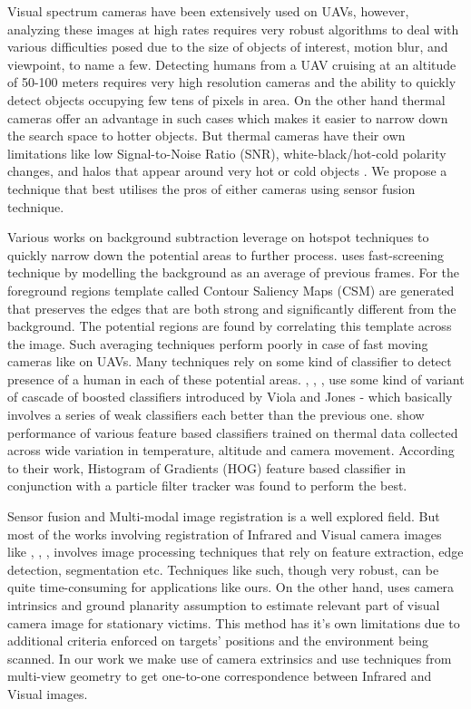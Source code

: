 \documentclass[runningheads]{llncs}
\begin{document}
Visual spectrum cameras have been extensively used on UAVs, however, analyzing these images at high rates requires very robust algorithms to deal with various difficulties posed due to the size of objects of interest, motion blur, and viewpoint, to name a few. Detecting humans from a UAV cruising at an altitude of 50-100 meters requires very high resolution cameras and the ability to quickly detect objects occupying few tens of pixels in area. On the other hand thermal cameras offer an advantage in such cases which makes it easier to narrow down the search space to hotter objects. But thermal cameras have their own limitations like low Signal-to-Noise Ratio (SNR), white-black/hot-cold polarity changes, and halos that appear around very hot or cold objects \cite{wang2010improved}. We propose a technique that best utilises the pros of either cameras using sensor fusion technique.

Various works on background subtraction leverage on hotspot techniques to quickly narrow down the potential areas to further process. \cite{davis2005two} uses fast-screening technique by modelling the background as an average of previous frames. For the foreground regions template called Contour Saliency Maps (CSM) are generated that preserves the edges that are both strong and significantly different from the background. The potential regions are found by correlating this template across the image. Such averaging techniques perform poorly in case of fast moving cameras like on UAVs. Many techniques rely on some kind of classifier to detect presence of a human in each of these potential areas. \cite{davis2005two}, \cite{1545530}, \cite{rudol2008human}, \cite{wang2010improved} use some kind of variant of cascade of boosted classifiers introduced by Viola and Jones \cite{viola2001rapid} - which basically involves a series of weak classifiers each better than the previous one. \cite{portmann2014people} show performance of various feature based classifiers trained on thermal data collected across wide variation in temperature, altitude and camera movement. According to their work, Histogram of Gradients (HOG) feature based classifier in conjunction with a particle filter tracker was found to perform the best.

Sensor fusion and Multi-modal image registration is a well explored field. But most of the works involving registration of Infrared and Visual camera images like \cite{doi:10.1117/12.7977034}, \cite{1384918}, \cite{4381164}, \cite{3911} involves image processing techniques that rely on feature extraction, edge detection, segmentation etc. Techniques like such, though very robust, can be quite time-consuming for applications like ours. On the other hand, \cite{rudol2008human} uses camera intrinsics and ground planarity assumption to estimate relevant part of visual camera image for stationary victims. This method has it's own limitations due to additional criteria enforced on targets' positions and the environment being scanned. In our work we make use of camera extrinsics and use techniques from multi-view geometry to get one-to-one correspondence between Infrared and Visual images.
\end{document}
